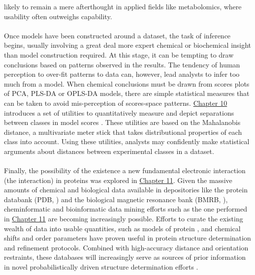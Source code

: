 \begin{doublespace}
likely to remain a mere afterthought in applied fields like metabolomics,
where usability often outweighs capability.
\\\\
Once models have been constructed around a dataset, the task of inference
begins, usually involving a great deal more expert chemical or biochemical
insight than model construction required. At this stage, it can be tempting
to draw conclusions based on patterns observed in the results. The tendency
of human perception to over-fit patterns to data can, however, lead analysts
to infer too much from a model. When chemical conclusions must be drawn from
scores plots of PCA, PLS-DA or OPLS-DA models, there are simple statistical
measures that can be taken to avoid mis-perception of scores-space patterns.
\hyperlink{chapter.10}{Chapter 10} introduces a set of utilities to
quantitatively measure and depict separations between classes in
model scores \cite{worley:abio2013}. These utilities are based on the
Mahalanobis distance, a multivariate meter stick \cite{demaesschalck:cils2000}
that takes distributional properties of each class into account. Using these
utilities, analysts may confidently make statistical arguments about distances
between experimental classes in a dataset.
\\\\
Finally, the possibility of the existence a new fundamental electronic
interaction (the \npistar{} interaction) in proteins was explored in
\hyperlink{chapter.11}{Chapter 11}. Given the massive amounts of chemical
and biological data available in depositories like the protein databank
(PDB, \cite{berman:nar2000}) and the biological magnetic resonance bank
(BMRB, \cite{ulrich:nar2008}), cheminformatic and bioinformatic data mining
efforts such as the one performed in \hyperlink{chapter.11}{Chapter 11} are
becoming increasingly possible. Efforts to curate the existing wealth of data
into usable quantities, such as models of protein \hnmr{}, \cnmr{} and \nnmr{}
chemical shifts \cite{osapay:jacs1991,spera:jacs1991,iwadate:jbnmr1999,
  han:jbnmr2011,li:jmr2015} and order parameters
\cite{berjanskii:jacs2005,berjanskii:jbnmr2008} have proven useful in
protein structure determination and refinement protocols. Combined with
high-accuracy distance \cite{vogeli:pnmrs2014} and orientation
\cite{li:cpc2015} restraints, these databases will increasingly serve
as sources of prior information in novel probabilistically driven structure
determination efforts \cite{nilges:struct2009,olsson:jctc2014}.
\\\\

\end{doublespace}
